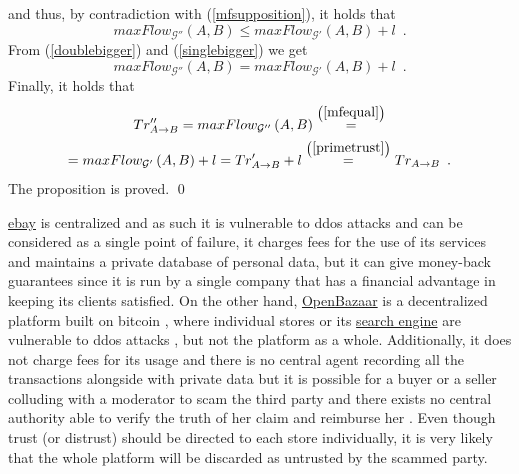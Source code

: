 \begin{sepproof}
       and thus, by contradiction with (\ref{mfsupposition}), it holds that
       \begin{equation}
       \label{singlebigger}
          maxFlow_{\mathcal{G}''}\left(A, B\right) \leq maxFlow_{\mathcal{G}'}\left(A, B\right) + l \enspace.
       \end{equation}
       From (\ref{doublebigger}) and (\ref{singlebigger}) we get
       \begin{equation}
       \label{mfequal}
          maxFlow_{\mathcal{G}''}\left(A, B\right) = maxFlow_{\mathcal{G}'}\left(A, B\right) + l \enspace.
       \end{equation}
       Finally, it holds that
       \begin{equation*}
       \begin{gathered}
          Tr''_{A \rightarrow B} = maxFlow_{\mathcal{G}''}\left(A, B\right) \overset{\left(\ref{mfequal}\right)}{=} \\
          = maxFlow_{\mathcal{G}'}\left(A, B\right) + l = Tr'_{A \rightarrow B} + l
          \overset{\left(\ref{primetrust}\right)}{=} Tr_{A \rightarrow B} \enspace.
       \end{gathered}
       \end{equation*}
       The proposition is proved. \qed
    \end{sepproof}

     \href{http://www.ebay.com}{ebay} is
     centralized and as such it is vulnerable to ddos attacks \cite{ddosattacks} and can be considered as a single point of
     failure, it charges fees for the use of its services \cite{ebayfees} and maintains a private database of personal data,
     but it can give money-back guarantees \cite{ebayguarantee} since it is run by a single company that has a financial
     advantage in keeping its clients satisfied. On the other hand, \href{https://openbazaar.org/}{OpenBazaar} is a
     decentralized platform built on bitcoin \cite{bitcoin}, where individual stores or its \href{https://duosear.ch}{search
     engine} are vulnerable to ddos attacks \cite{ddosattacks}, but not the platform as a whole. Additionally, it does not
     charge fees for its usage \cite{openbazaar} and there is no central agent recording all the transactions alongside with
     private data \cite{openbazaar} but it is possible for a buyer or a seller colluding with a  moderator to scam the third
     party and there exists no central authority able to verify the truth of her claim and reimburse her
     \cite{multisigfraud}. Even though trust (or distrust) should be directed to each store individually, it is very likely
     that the whole platform will be discarded as untrusted by the scammed party.

